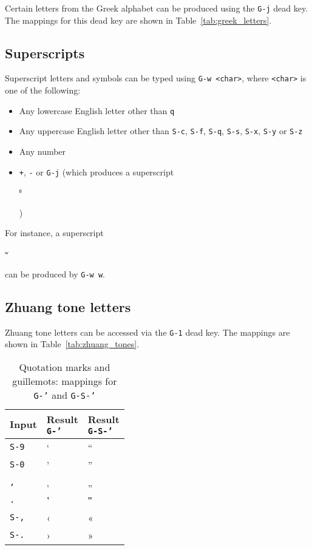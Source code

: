 \documentclass[oneside]{memoir}
\newcommand{\key}{\verb}
\newcommand{\keynv}{\texttt}
\newcommand{\out}[1]{\colorbox{gray!20}{\strut{}#1}}
\begin{document}
Certain letters from the Greek alphabet can be produced using the \key|G-j| dead key.
The mappings for this dead key are shown in Table~\ref{tab:greek_letters}.

\subsection{Superscripts}
\label{sec:superscripts}

Superscript letters and symbols can be typed using \key|G-w <char>|, where \key|<char>| is one of the following:
\begin{itemize}[noitemsep]
\item Any lowercase English letter other than \key|q|
\item Any uppercase English letter other than \key|S-c|, \key|S-f|, \key|S-q|, \key|S-s|, \key|S-x|, \key|S-y| or \key|S-z|
\item Any number
\item \key|+|, \key|-| or \key|G-j| (which produces a superscript \out{ᶿ})
\end{itemize}
For instance, a superscript \out{ʷ} can be produced by \key|G-w w|.

\subsection{Zhuang tone letters}
\label{sec:zhuang_tones}


Zhuang tone letters can be accessed via the \key|G-1| dead key.
The mappings are shown in Table~\ref{tab:zhuang_tones}.

\begin{table}[t]
\caption{Quotation marks and guillemots: mappings for \keynv{G-'} and \keynv{G-S-'}}
\label{tab:quotes_guillemots}
\centering
\begin{tabular}{lll}
\toprule
Input & \makecell{Result\\\keynv{G-'}} & \makecell{Result\\\keynv{G-S-'}} \\
\midrule
\key|S-9| & ‘ & “ \\
\key|S-0| & ’ & ” \\
\key|,|   & ‚ & „ \\
\key|.|   & ‛ & ‟ \\
\key|S-,| & ‹ & « \\
\key|S-.| & › & » \\
\bottomrule
\end{tabular}
\end{table}
\end{document}
